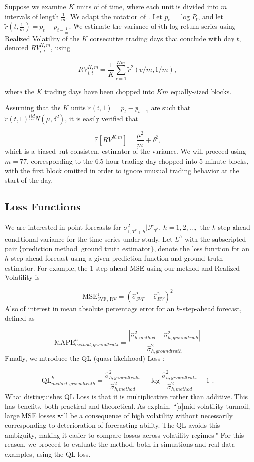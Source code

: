 \documentclass[11pt,3p,review,authoryear]{elsarticle}
\newcommand{\simiid}{\stackrel{iid}{\sim}} %
\def\E{\mathbb{E}} %
\theoremstyle{definition}
\begin{document}
    Suppose we examine $K$ units of of time, where each unit is divided into $m$ intervals of length $\frac{1}{m}$.  We adapt the notation of \citet{andersen2008realized}. Let $p_{t} = \log{P_{t}}$, and let $\tilde{r}(t,\frac{1}{m}) = p_{t} - p_{t-\frac{1}{m}}$.  We estimate the variance of $i$th log return series using Realized Volatility of the $K$ consecutive trading days that conclude with day $t$, denoted $RV_{i,t}^{K,m}$, using
    
    $$RV_{i,t}^{K,m} = \frac{1}{K}\sum^{Km}_{v=1}\tilde{r}^{2}(v/m,1/m),$$

    where the $K$ trading days have been chopped into $Km$ equally-sized blocks.

    Assuming that the $K$ units $\tilde{r}(t, 1) = p_{t} - p_{t-1}$ are such that $\tilde{r}(t, 1) \simiid N(\mu, \delta^{2})$, it is easily verified that 
    
    $$\E[RV^{K,m}] = \frac{\mu^{2}}{m} + \delta^{2},$$
    which is a biased but consistent estimator of the variance.  We will proceed using $m = 77$, corresponding to the 6.5-hour trading day chopped into 5-minute blocks, with the first block omitted in order to ignore unusual trading behavior at the start of the day.

\subsection{Loss Functions}

We are interested in point forecasts for $\sigma^{2}_{1,T^{*}+h}|\mathcal{F}_{T^{*}}$, $h=1,2,...,$ the $h$-step ahead conditional variance for the time series under study.  Let $L^{h}$ with the subscripted pair $\{$prediction method, ground truth estimator$\}$, denote the loss function for an $h$-step-ahead forecast using a given prediction function and ground truth estimator.  For example, the 1-step-ahead MSE using our method and Realized Volatility is

$$ \text{MSE}^{1}_{\text{SVF, RV}} = (\hat\sigma^{2}_{SVF} - \hat\sigma^{2}_{RV})^{2}$$
Also of interest in mean absolute percentage error for an $h$-step-ahead forecast, defined as

\[ 
\text{MAPE}^{h}_{method, ground truth} = \frac{|\hat\sigma^{2}_{h, method} - \hat\sigma^{2}_{h, ground truth}|}{\hat\sigma^{2}_{h, ground truth}}
\]
Finally, we introduce the QL (quasi-likelihood) Loss \citep{brownlees2011practical}:

\[ 
\text{QL}^{h}_{method, ground truth} = \frac{\hat\sigma^{2}_{h, ground truth}}{ \hat\sigma^{2}_{h, method}} - \log{\frac{\hat\sigma^{2}_{h, ground truth}}{ \hat\sigma^{2}_{h, method}}} -1 \text{ .}
\]
What distinguishes QL Loss is that it is multiplicative rather than additive.  This has benefits, both practical and theoretical.  As \citet{brownlees2011practical} explain, ``[a]mid volatility turmoil, large MSE
losses will be a consequence of high volatility without necessarily corresponding to
deterioration of forecasting ability. The QL avoids this ambiguity, making it easier to
compare losses across volatility regimes."  For this reason, we proceed to evaluate the method, both in simuations and real data examples, using the QL loss.
\end{document}
